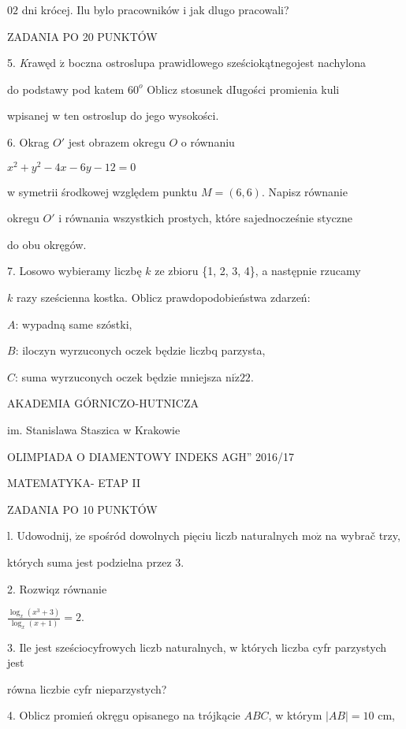 \documentclass[a4paper,12pt]{article}
\begin{document}
$02$ dni krócej. Ilu bylo pracowników i jak dlugo pracowali?

ZADANIA PO 20 PUNKTÓW

5. {\it K}rawęd $\acute{\mathrm{z}}$ boczna ostroslupa prawidlowego sześciokątnegojest nachylona

do podstawy pod katem $60^{o}$ Oblicz stosunek dIugości promienia kuli

wpisanej w ten ostroslup do jego wysokości.

6. Okrag $O'$ jest obrazem okregu $O$ o równaniu

$x^{2}+y^{2}-4x-6y-12=0$

w symetrii środkowej względem punktu $M= (6,6)$. Napisz równanie

okregu $O'$ i równania wszystkich prostych, które sajednocześnie styczne

do obu okręgów.

7. Losowo wybieramy liczbę $k$ ze zbioru \{1, 2, 3, 4\}, a następnie rzucamy

$k$ razy sześcienna kostka. Oblicz prawdopodobieństwa zdarzeń:

$A$: wypadną same szóstki,

$B$: iloczyn wyrzuconych oczek będzie liczbq parzysta,

$C$: suma wyrzuconych oczek będzie mniejsza $\mathrm{n}\mathrm{i}\dot{\mathrm{z}}22.$






AKADEMIA GÓRNICZO-HUTNICZA

im. Stanislawa Staszica w Krakowie

OLIMPIADA O DIAMENTOWY INDEKS AGH'' 2016/17

MATEMATYKA- ETAP II

ZADANIA PO 10 PUNKTÓW

l. Udowodnij, $\dot{\mathrm{z}}\mathrm{e}$ spośród dowolnych pięciu liczb naturalnych $\mathrm{m}\mathrm{o}\dot{\mathrm{z}}$ na wybrač trzy,

których suma jest podzielna przez 3.

2. Rozwiqz równanie

$\displaystyle \frac{\log_{x}(x^{3}+3)}{\log_{x}(x+1)}=2.$

3. Ile jest sześciocyfrowych liczb naturalnych, w których liczba cyfr parzystych jest

równa liczbie cyfr nieparzystych?

4. Oblicz promień okręgu opisanego na trójkącie $ABC$, w którym $|AB|=10$ cm,
\end{document}
